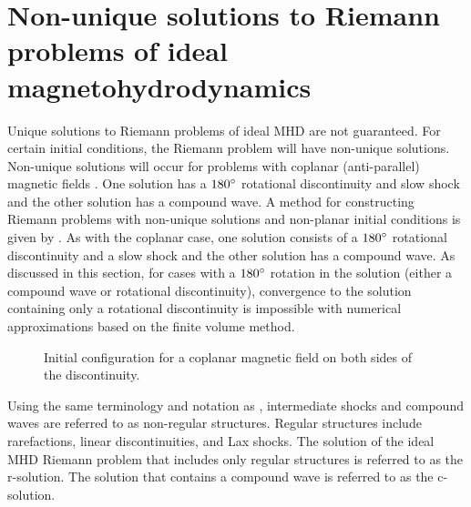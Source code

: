\section[Non-unique solutions to Riemann problems of ideal magnetohydrodynamics]{Non-unique solutions to Riemann problems of ideal magnetohydrodynamics}
\label{sec:nonunique}

Unique solutions to Riemann problems of ideal MHD are not guaranteed.  For certain initial conditions, the Riemann problem will have non-unique solutions.  Non-unique solutions will occur for problems with coplanar (anti-parallel) magnetic fields \citep{Barmin:1996}.  One solution has a $180^\circ$ rotational discontinuity and slow shock and the other solution has a compound wave.  A method for constructing Riemann problems with non-unique solutions and non-planar initial conditions is given by \citet{Torrilhon:2003a}.  As with the coplanar case, one solution consists of a $180^\circ$ rotational discontinuity and a slow shock and the other solution has a compound wave.  As discussed in this section, for cases with a $180^\circ$ rotation in the solution (either a compound wave or rotational discontinuity), convergence to the solution containing only a rotational discontinuity is impossible with numerical approximations based on the finite volume method.

\begin{figure}[htbp]\figSpace 
\begin{center}

\end{center}
\caption{Initial configuration for a coplanar magnetic field on both sides of the discontinuity.}
\label{fig:bfield_init_coplanar}
\figSpace
\end{figure}


Using the same terminology and notation as \citet{Torrilhon:2003b}, intermediate shocks and compound waves are referred to as non-regular structures.  Regular structures include rarefactions, linear discontinuities, and Lax shocks.  The solution of the ideal MHD Riemann problem that includes only regular structures is referred to as the r-solution.  The solution that contains a compound wave is referred to as the c-solution.

